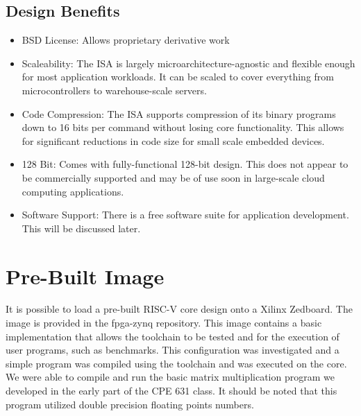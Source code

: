 \documentclass[journal]{IEEEtran}
\begin{document}
\subsection{Design Benefits}
\begin{itemize}
\item BSD License:\newline
  Allows proprietary derivative work
\item Scaleability:\newline
  The ISA is largely microarchitecture-agnostic and flexible enough for most application workloads. It can be scaled to cover everything from microcontrollers to warehouse-scale servers.
\item Code Compression:\newline
  The ISA supports compression of its binary programs down to 16 bits per command without losing core functionality. This allows for significant reductions in code size for small scale embedded devices.
\item 128 Bit:\newline
  Comes with fully-functional 128-bit design. This does not appear to be commercially supported and may be of use soon in large-scale cloud computing applications.
\item Software Support:\newline
  There is a free software suite for application development. This will be discussed later.
\end{itemize}

\section{Pre-Built Image}
It is possible to load a pre-built RISC-V core design onto a Xilinx Zedboard. The image is provided in the fpga-zynq repository. This image contains a basic implementation that allows the toolchain to be tested and for the execution of user programs, such as benchmarks. This configuration was investigated and a simple program was compiled using the toolchain and was executed on the core. We were able to compile and run the basic matrix multiplication program we developed in the early part of the CPE 631 class. It should be noted that this program utilized double precision floating points numbers.
\end{document}
